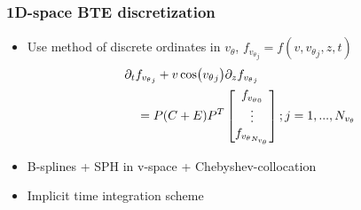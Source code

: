 \documentclass[mathserif, aspectratio=169]{beamer}
\newcommand{\vect}[1]{\boldsymbol{#1}}
\newcommand{\of}[1]{\mleft( #1 \mright)}
\newcommand{\vtheta}{{v_{\theta}}}
\begin{document}
\begin{frame}
	\frametitle{1D-space BTE discretization}

	\begin{itemize}
		\item Use method of discrete ordinates in $\vtheta$, $f_{\vtheta_j} = f(v, \vtheta_j, z, t)$
		\begin{align*}
			\tiny
			&\partial_t f_{\vtheta_j} + v\cos\of{\vtheta_j} \partial_z f_{\vtheta_j} \nonumber \\
			&\quad = P (C + E) P^{T}\begin{bmatrix}
				f_{\vtheta_0}\\
				\vdots\\
				f_{\vtheta_{N_\vtheta}}\\
			\end{bmatrix} ; j=1,..., N_{\vtheta}
			\label{eq:bte_discreate}
		\end{align*}
		\item B-splines + SPH in v-space +  Chebyshev-collocation %
		\item Implicit time integration scheme
	\end{itemize}


\end{frame}
\end{document}
